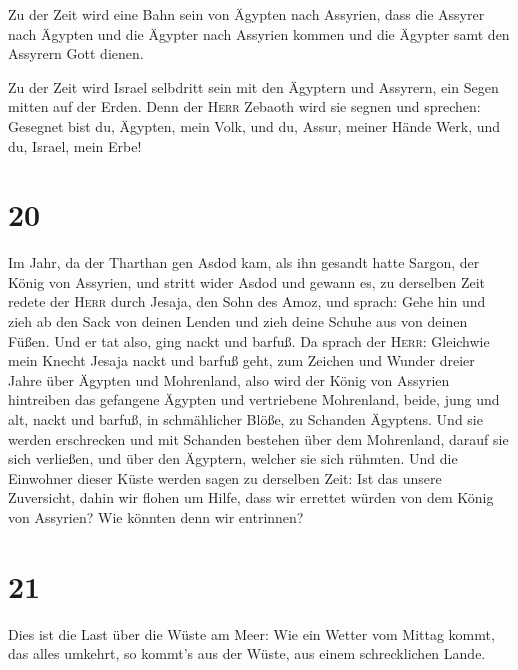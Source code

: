  Zu der Zeit wird eine Bahn sein von Ägypten nach
Assyrien, dass die Assyrer nach Ägypten und die Ägypter nach Assyrien
kommen und die Ägypter samt den Assyrern Gott dienen.

 Zu der Zeit wird Israel selbdritt sein mit den Ägyptern
und Assyrern, ein Segen mitten auf der Erden.  Denn der
\textsc{Herr} Zebaoth wird sie segnen und sprechen: Gesegnet bist du,
Ägypten, mein Volk, und du, Assur, meiner Hände Werk, und du, Israel,
mein Erbe!

\hypertarget{section-19}{%
\section{20}\label{section-19}}

 Im Jahr, da der Tharthan gen Asdod kam, als ihn gesandt
hatte Sargon, der König von Assyrien, und stritt wider Asdod und gewann
es,  zu derselben Zeit redete der \textsc{Herr} durch
Jesaja, den Sohn des Amoz, und sprach: Gehe hin und zieh ab den Sack von
deinen Lenden und zieh deine Schuhe aus von deinen Füßen. Und er tat
also, ging nackt und barfuß.  Da sprach der \textsc{Herr}:
Gleichwie mein Knecht Jesaja nackt und barfuß geht, zum Zeichen und
Wunder dreier Jahre über Ägypten und Mohrenland,  also
wird der König von Assyrien hintreiben das gefangene Ägypten und
vertriebene Mohrenland, beide, jung und alt, nackt und barfuß, in
schmählicher Blöße, zu Schanden Ägyptens.  Und sie werden
erschrecken und mit Schanden bestehen über dem Mohrenland, darauf sie
sich verließen, und über den Ägyptern, welcher sie sich rühmten.
 Und die Einwohner dieser Küste werden sagen zu derselben
Zeit: Ist das unsere Zuversicht, dahin wir flohen um Hilfe, dass wir
errettet würden von dem König von Assyrien? Wie könnten denn wir
entrinnen?

\hypertarget{section-20}{%
\section{21}\label{section-20}}

 Dies ist die Last über die Wüste am Meer: Wie ein Wetter
vom Mittag kommt, das alles umkehrt, so kommt's aus der Wüste, aus einem
schrecklichen Lande.

